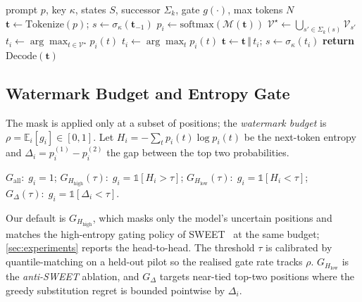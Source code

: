 \begin{algorithm}[t]
  \caption{ChainMark Watermark Embedding}
  \label{alg:embed}
  \begin{algorithmic}
     prompt $p$, key $\kappa$, states $S$,
      successor $\Sigma_k$, gate $g(\cdot)$, max tokens $N$
    \STATE $\mathbf{t} \leftarrow \mathrm{Tokenize}(p)$;
      $s \leftarrow \sigma_\kappa(\mathbf{t}_{-1})$
      \STATE $p_i \leftarrow \mathrm{softmax}(\mathcal{M}(\mathbf{t}))$
      \STATE $\mathcal{V}^\star \leftarrow
        \bigcup_{s' \in \Sigma_k(s)} \mathcal{V}_{s'}$
        \STATE $t_i \leftarrow \arg\max_{t \in \mathcal{V}^\star} p_i(t)$
      \ELSE
        \STATE $t_i \leftarrow \arg\max_t p_i(t)$
      \ENDIF
      \STATE $\mathbf{t} \leftarrow \mathbf{t} \,\Vert\, t_i$;
        $s \leftarrow \sigma_\kappa(t_i)$
        \ENDIF
    \ENDFOR
    \STATE \textbf{return} $\mathrm{Decode}(\mathbf{t})$
  \end{algorithmic}
\end{algorithm}

\subsection{Watermark Budget and Entropy Gate}
\label{subsec:gates}

The mask is applied only at a subset of positions; the
\emph{watermark budget} is $\rho = \mathbb{E}_i[g_i] \in [0,1]$. Let
$H_i = -\sum_t p_i(t) \log p_i(t)$ be the next-token entropy and
$\Delta_i = p_i^{(1)} - p_i^{(2)}$ the gap between the top two
probabilities.

\begin{definition}
  \label{def:gate}
  $G_{\mathrm{all}}{:}\; g_i = 1$;\;
  $G_{H_{\mathrm{high}}}(\tau){:}\; g_i = \mathbb{1}[H_i > \tau]$;\;
  $G_{H_{\mathrm{low}}}(\tau){:}\; g_i = \mathbb{1}[H_i < \tau]$;\;
  $G_{\Delta}(\tau){:}\; g_i = \mathbb{1}[\Delta_i < \tau]$.
\end{definition}

Our default is $G_{H_{\mathrm{high}}}$, which masks only the model's
uncertain positions and matches the high-entropy gating policy of
SWEET~\citep{lee2023sweet} at the same budget;
\autoref{sec:experiments} reports the head-to-head. The threshold
$\tau$ is calibrated by quantile-matching on a held-out pilot so the
realised gate rate tracks $\rho$. $G_{H_{\mathrm{low}}}$ is the
\emph{anti-SWEET} ablation, and $G_{\Delta}$ targets near-tied
top-two positions where the greedy substitution regret is bounded
pointwise by $\Delta_i$.

